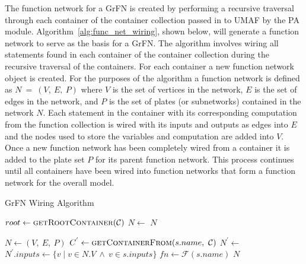 The function network for a GrFN is created by performing a recursive traversal through each container of the container collection passed in to UMAF by the PA module.
Algorithm~\ref{alg:func_net_wiring}, shown below, will generate a function network to serve as the basis for a GrFN.
The algorithm involves wiring all statements found in each container of the container collection during the recursive traversal of the containers.
For each container a new function network object is created.
For the purposes of the algorithm a function network is defined as $N~=~(V,~E,~P)$ where $V$ is the set of vertices in the network, $E$ is the set of edges in the network, and $P$ is the set of plates (or subnetworks) contained in the network $N$.
Each statement in the container with its corresponding computation from the function collection is wired with its inputs and outputs as edges into $E$ and the nodes used to store the variables and computation are added into $V$.
Once a new function network has been completely wired from a container it is added to the plate set $P$ for its parent function network.
This process continues until all containers have been wired into function networks that form a function network for the overall model.

\begin{algorithm}
  \caption{GrFN Wiring Algorithm}
  \label{alg:func_net_wiring}
  \begin{algorithmic}[1]
     
    \State $root \gets \Call{getRootContainer}{\mathcal{C}}$
    \State $N \gets$ 
    \State \Return $N$
    \EndProcedure

     
      \State $N \gets (V,~E,~P)$
       
         
          \State $C^{'} \gets \Call{getContainerFrom}{s.name,~\mathcal{C}}$
          \State $N^{'} \gets$ 
          \State $N^{'}.inputs \gets \{ v \mid v \in N.V ~\land~ v \in s.inputs \}$
            \State {}
            \State {}
          \EndFor
          \State {}
        \Else {}
          \State $fn \gets \mathcal{F}(s.name)$
          \State {}
          \State {}
          \State {}
            \State {}
            \State {}
          \EndFor
        \EndIf
      \EndFor
      \State \Return $N$
    \EndProcedure
  \end{algorithmic}
\end{algorithm}

